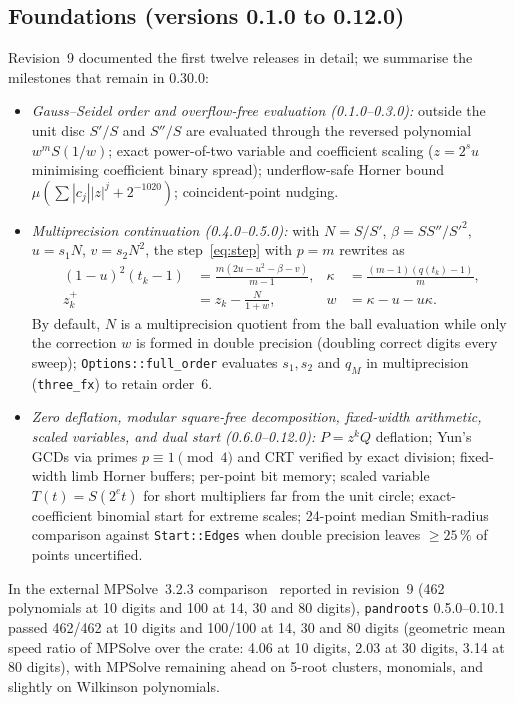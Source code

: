 \documentclass[10pt,a4paper]{article}
\theoremstyle{definition}
\numberwithin{equation}{section}
\begin{document}
\subsection{Foundations (versions 0.1.0 to 0.12.0)}
Revision~9 documented the first twelve releases in detail; we summarise the milestones that remain in 0.30.0:
\begin{itemize}
\item \emph{Gauss--Seidel order and overflow-free evaluation (0.1.0--0.3.0):} outside the unit disc $S'/S$ and $S''/S$ are evaluated through the reversed polynomial $w^m S(1/w)$; exact power-of-two variable and coefficient scaling ($z=2^s u$ minimising coefficient binary spread); underflow-safe Horner bound $\mu(\sum|c_j||z|^j+2^{-1020})$; coincident-point nudging.
\item \emph{Multiprecision continuation (0.4.0--0.5.0):} with $N=S/S'$, $\beta=SS''/S'^2$, $u=s_1 N$, $v=s_2 N^2$, the step~\eqref{eq:step} with $p=m$ rewrites as
\begin{equation}\label{eq:precise}
\begin{aligned}
 (1-u)^2(t_k-1)&=\frac{m(2u-u^2-\beta-v)}{m-1}, &
 \kappa&=\frac{(m-1)(q(t_k)-1)}{m},\\
 z_k^+&=z_k-\frac{N}{1+w}, &
 w&=\kappa-u-u\kappa.
\end{aligned}
\end{equation}
By default, $N$ is a multiprecision quotient from the ball evaluation while only the correction $w$ is formed in double precision (doubling correct digits every sweep); \texttt{Options::full\_order} evaluates $s_1,s_2$ and $q_M$ in multiprecision (\texttt{three\_fx}) to retain order~6.
\item \emph{Zero deflation, modular square-free decomposition, fixed-width arithmetic, scaled variables, and dual start (0.6.0--0.12.0):} $P=z^k Q$ deflation; Yun's GCDs via primes $p\equiv 1\pmod4$ and CRT verified by exact division; fixed-width limb Horner buffers; per-point bit memory; scaled variable $T(t)=S(2^e t)$ for short multipliers far from the unit circle; exact-coefficient binomial start for extreme scales; 24-point median Smith-radius comparison against \texttt{Start::Edges} when double precision leaves $\ge 25\,\%$ of points uncertified.
\end{itemize}
In the external MPSolve~3.2.3 comparison~\cite{mpsolve} reported in revision~9 (462 polynomials at 10 digits and 100 at 14, 30 and 80 digits), \texttt{pandroots} 0.5.0--0.10.1 passed 462/462 at 10 digits and 100/100 at 14, 30 and 80 digits (geometric mean speed ratio of MPSolve over the crate: 4.06 at 10 digits, 2.03 at 30 digits, 3.14 at 80 digits), with MPSolve remaining ahead on 5-root clusters, monomials, and slightly on Wilkinson polynomials.
\end{document}
